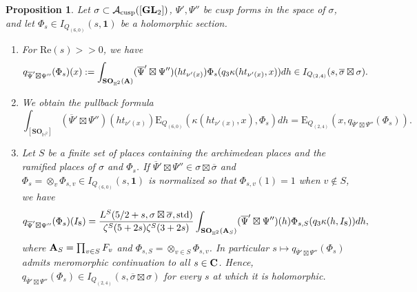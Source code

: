 \documentclass[11pt, reqno]{amsart}
\theoremstyle{plain}
\newtheorem{proposition}[theorem]{Proposition}
\theoremstyle{definition}
\theoremstyle{remark}
\theoremstyle{plain}
\def\C{{\bf C}}
\def\A{{\bf A}}
\def\GL{\mathbf{GL}}
\begin{document}
\begin{proposition}\label{Proposition:Pullback:Orthogonal}
    Let $\sigma \subset \mathcal{A}_{\rm cusp}([\GL_2])$, $\Psi',\Psi''$ be cusp forms in the space of $\sigma$, and let $\Phi_{s} \in  I_{Q_{(6,0)}}(s,\mathbf{1}) $ be a holomorphic section.
    \begin{enumerate}
    \item For $\mathrm{Re}(s)>>0$, we have
    \begin{align*}
    q_{\overline{\Psi}'\boxtimes\Psi''}(\Phi_{s})(x) := \int_{\mathbf{SO}_{\mathbb{H}^2}(\A)}(\overline{\Psi}'\boxtimes\Psi'')(ht_{\nu'(x)})\Phi_{s}(q_3\kappa(ht_{\nu'(x)},x))dh\in I_{Q_{(2,4)}}(s,\overline{\sigma}\boxtimes \sigma).
    \end{align*}
    \item We obtain the pullback formula
    \[\int_{[\mathbf{SO}_{\mathbb{H}^2}]}(\overline{\Psi}'\boxtimes\Psi'')(ht_{\nu'(x)})\mathrm{E}_{Q_{(6,0)}}(\kappa(h t_{\nu'(x)},x),\Phi_{s})dh = \mathrm{E}_{Q_{(2,4)}}(x,q_{\overline{\Psi}'\boxtimes\Psi''}(\Phi_{s})).\]
    \item Let $S$ be a finite set of places containing the archimedean places and the ramified places of $\sigma$ and $\Phi_s$. If $\overline{\Psi}'\boxtimes\Psi'' \in   \sigma\boxtimes \overline{\sigma}$ and $\Phi_{s} = \otimes_v \Phi_{s,v}\in I_{Q_{(6,0)}}(s,\mathbf{1})$ is normalized so that $\Phi_{s,v}(1) = 1$ when $v \not \in S$, we have \[q_{\overline{\Psi}'\boxtimes\Psi''}(\Phi_{s})(I_8) =  \frac{L^S(5/2+s,\sigma\boxtimes\overline{\sigma},\mathrm{std})}{\zeta^S(5+2s)\zeta^S(3+2s)} \int_{\mathbf{SO}_{\mathbb{H}^2}(\A_S)}(\overline{\Psi}'\boxtimes\Psi'')(h)\Phi_{s,S}(q_3\kappa(h,I_8))dh,\] 
    where $\A_S = \prod_{v\in S} F_v$ and $ \Phi_{s,S} = \otimes_{v \in S} \Phi_{s,v}$. In particular $s\mapsto q_{\overline{\Psi}'\boxtimes\Psi''}(\Phi_{s})$ admits meromorphic continuation to all $s\in \C$. Hence,  $q_{\overline{\Psi}'\boxtimes\Psi''}(\Phi_{s})\in I_{Q_{(2,4)}}(s,\overline{\sigma}\boxtimes \sigma)$ for every $s$ at which it is holomorphic.
    \end{enumerate}
\end{proposition}
\end{document}
